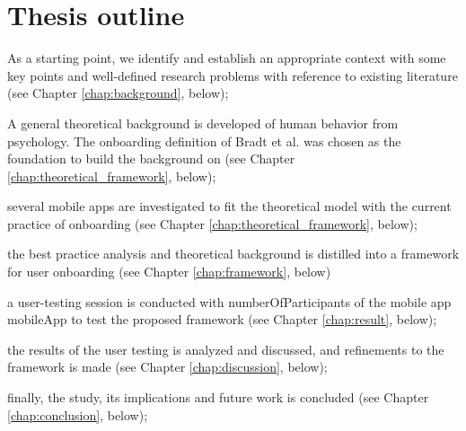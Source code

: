 \section{Thesis outline}
\begin{enumerate*}[label=(\(\arabic*\))]
  \item As a starting point, we identify and establish an appropriate context with some key points and well-defined research problems with reference to existing literature (see Chapter \ref{chap:background}, below);
  \item A general theoretical background is developed of human behavior from psychology. The onboarding definition of Bradt et al. \cite{Bradt2009} was chosen as the foundation to build the background on (see Chapter \ref{chap:theoretical_framework}, below);
  \item several mobile apps are investigated to fit the theoretical model with the current practice of onboarding (see Chapter \ref{chap:theoretical_framework}, below);
  \item the best practice analysis and theoretical background is distilled into a framework for user onboarding (see Chapter \ref{chap:framework}, below)
  \item a user-testing session is conducted with numberOfParticipants of the mobile app mobileApp to test the proposed framework (see Chapter \ref{chap:result}, below);
  \item the results of the user testing is analyzed and discussed, and refinements to the framework is made (see Chapter \ref{chap:discussion}, below);
  \item finally, the study, its implications and future work is concluded (see Chapter \ref{chap:conclusion}, below); 
\end{enumerate*}
